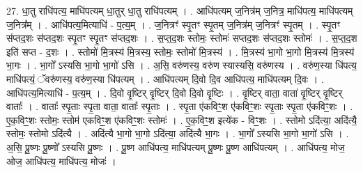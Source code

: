 \documentclass[17pt]{extarticle}
\begin{document}
27. धा॒तु राधि॑पत्य॒ माधि॑पत्यम् धा॒तुर् धा॒तु राधि॑पत्यम् । . आधि॑पत्यम् ज॒नित्र॑म् ज॒नित्र॒ माधि॑पत्य॒ माधि॑पत्यम् ज॒नित्र᳚म् । . आधि॑पत्य॒मित्याधि॑ - प॒त्य॒म् । . ज॒नित्रꣳ॑ स्पृ॒तꣳ स्पृ॒तम् ज॒नित्र॑म् ज॒नित्रꣳ॑ स्पृ॒तम् । . स्पृ॒तꣳ स॑प्तद॒शः स॑प्तद॒शः स्पृ॒तꣳ स्पृ॒तꣳ स॑प्तद॒शः । . स॒प्त॒द॒शः स्तोमः॒ स्तोमः॑ सप्तद॒शः स॑प्तद॒शः स्तोमः॑ । . स॒प्त॒द॒श इति॑ सप्त - द॒शः । . स्तोमो॑ मि॒त्रस्य॑ मि॒त्रस्य॒ स्तोमः॒ स्तोमो॑ मि॒त्रस्य॑ । . मि॒त्रस्य॑ भा॒गो भा॒गो मि॒त्रस्य॑ मि॒त्रस्य॑ भा॒गः । . भा॒गो᳚ ऽस्यसि भा॒गो भा॒गो॑ ऽसि । . अ॒सि॒ वरु॑णस्य॒ वरु॑ण स्यास्यसि॒ वरु॑णस्य । . वरु॑ण॒स्या धि॑पत्य॒ माधि॑पत्यं॒ ॅवरु॑णस्य॒ वरु॑ण॒स्या धि॑पत्यम् । . आधि॑पत्यम् दि॒वो दि॒व आधि॑पत्य॒ माधि॑पत्यम् दि॒वः । . आधि॑पत्य॒मित्याधि॑ - प॒त्य॒म् । . दि॒वो वृ॒ष्टिर् वृ॒ष्टिर् दि॒वो दि॒वो वृ॒ष्टिः । . वृ॒ष्टिर् वाता॒ वाता॑ वृ॒ष्टिर् वृ॒ष्टिर् वाताः᳚ । . वाताः᳚ स्पृ॒ताः स्पृ॒ता वाता॒ वाताः᳚ स्पृ॒ताः । . स्पृ॒ता ए॑कविꣳ॒॒श ए॑कविꣳ॒॒शः स्पृ॒ताः स्पृ॒ता ए॑कविꣳ॒॒शः । . ए॒क॒विꣳ॒॒शः स्तोमः॒ स्तोम॑ एकविꣳ॒॒श ए॑कविꣳ॒॒शः स्तोमः॑ । . ए॒क॒विꣳ॒॒श इत्ये॑क - विꣳ॒॒शः । . स्तोमो ऽदि॑त्या॒ अदि॑त्यै॒ स्तोमः॒ स्तोमो ऽदि॑त्यै । . अदि॑त्यै भा॒गो भा॒गो ऽदि॑त्या॒ अदि॑त्यै भा॒गः । . भा॒गो᳚ ऽस्यसि भा॒गो भा॒गो॑ ऽसि । . अ॒सि॒ पू॒ष्णः पू॒ष्णो᳚ ऽस्यसि पू॒ष्णः । . पू॒ष्ण आधि॑पत्य॒ माधि॑पत्यम् पू॒ष्णः पू॒ष्ण आधि॑पत्यम् । . आधि॑पत्य॒ मोज॒ ओज॒ आधि॑पत्य॒ माधि॑पत्य॒ मोजः॑ । \newline
\end{document}
